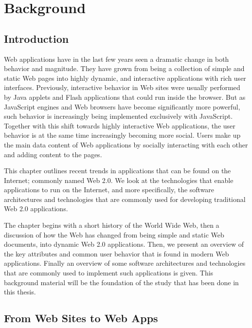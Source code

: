 \chapter{Background}     

\section{Introduction}
Web applications have in the last few years seen a dramatic change in both behavior and magnitude. They have grown from being a collection of simple and static Web pages into highly dynamic, and interactive applications with rich user interfaces. Previously, interactive behavior in Web sites were usually performed by Java applets and Flash applications \cite{spa} that could run inside the browser. But as JavaScript engines and Web browsers have become significantly more powerful, such behavior is increasingly being implemented exclusively with JavaScript\cite{spa}. Together with this shift towards highly interactive Web applications, the user behavior is at the same time increasingly becoming more social. Users make up the main data content of Web applications by socially interacting with each other and adding content to the pages. 

This chapter outlines recent trends in applications that can be found on the Internet; commonly named  Web 2.0\cite{web20book}. We look at the technologies that enable applications to run on the Internet, and more specifically, the software architectures and technologies that are commonly used for developing traditional Web 2.0 applications. 

The chapter begins with a short history of the World Wide Web, then a discussion of how the Web has changed from being simple and static Web documents, into dynamic Web 2.0 applications.  Then, we present an overview of the key attributes and common user behavior that is found in modern Web applications. Finally an overview of some software architectures and technologies that are commonly used to implement such applications is given. This background material will be the foundation of the study that has been done in this thesis.


\section{From Web Sites to Web Apps}

